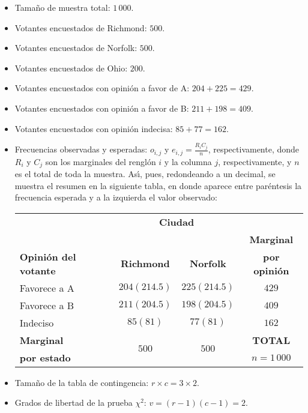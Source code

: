 \begin{solucion}
 \begin{datos}
  $\phantom{0}$
  \begin{itemize}
   \item Tamaño de muestra total: $1\,000$.
   \item Votantes encuestados de Richmond: $500$.
   \item Votantes encuestados de Norfolk: $500$.
   \item Votantes encuestados de Ohio: $200$.
   \item Votantes encuestados con opini\'on a favor de A: $204 + 225 = 429$.
   \item Votantes encuestados con opini\'on a favor de B: $211 + 198 = 409$.
   \item Votantes encuestados con opini\'on indecisa: $85 + 77 = 162$.
   \item Frecuencias observadas y esperadas: $o_{i,j}$
   y $e_{i,j}=\frac{R_i C_j}{n}$, respectivamente,
   donde $R_i$ y $C_j$ son los marginales del rengl\'on $i$ y la columna $j$,
   respectivamente, y $n$ es el total de toda la muestra.
   As\'{\i}, pues, redondeando a un decimal, se muestra el resumen 
   en la siguiente tabla,
   en donde aparece entre par\'entesis la frecuencia esperada
   y a la izquierda el valor observado:
   \begin{center}
    \begin{tabular}{lcc|c}
     & \multicolumn{2}{c}{\textbf{Ciudad}} \\
     \cline{2-3} & & & \textbf{Marginal} \\
     \textbf{Opini\'on del votante} & \textbf{Richmond} & \textbf{Norfolk} &
     \textbf{por opini\'on} \\
     \hline
     Favorece a A & $204 (214.5)$ & $225 (214.5)$ & $429$ \\
     Favorece a B & $211 (204.5)$ & $198 (204.5)$ & $409$ \\
     Indeciso & $85 (81)$ & $77 (81)$ & $162$ \\
     \hline 
     \textbf{Marginal} & \multirow{2}{*}{$500$} & \multirow{2}{*}{$500$} &
     \textbf{TOTAL} \\
     \textbf{por estado} & & & $n=1\,000$
    \end{tabular}
   \end{center}
   \item Tama\~no de la tabla de contingencia: $r\times c = 3\times 2$.
   \item Grados de libertad de la prueba $\chi^2$: $v = (r-1)(c-1) = 2$.
  \end{itemize}
 \end{datos}
 

\end{solucion}

